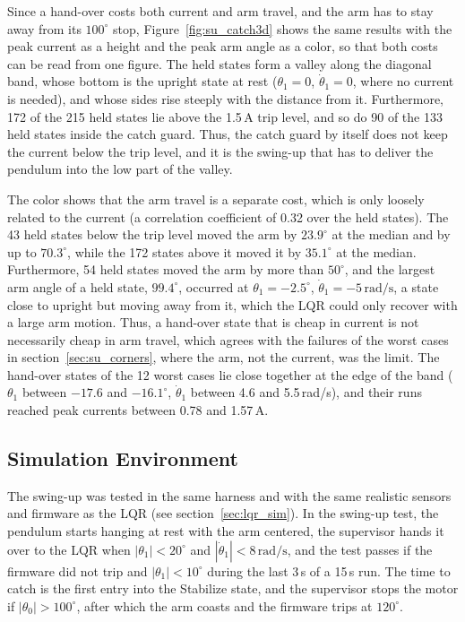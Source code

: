 \documentclass[a4paper,11pt]{article}
\begin{document}
Since a hand-over costs both current and arm travel, and the arm has to stay away from its $100^\circ$ stop, Figure~\ref{fig:su_catch3d} shows the same results with the peak current as a height and the peak arm angle as a color, so that both costs can be read from one figure. The held states form a valley along the diagonal band, whose bottom is the upright state at rest ($\theta_1 = 0$, $\dot\theta_1 = 0$, where no current is needed), and whose sides rise steeply with the distance from it. Furthermore, 172 of the 215 held states lie above the 1.5\,A trip level, and so do 90 of the 133 held states inside the catch guard. Thus, the catch guard by itself does not keep the current below the trip level, and it is the swing-up that has to deliver the pendulum into the low part of the valley.

The color shows that the arm travel is a separate cost, which is only loosely related to the current (a correlation coefficient of 0.32 over the held states). The 43 held states below the trip level moved the arm by $23.9^\circ$ at the median and by up to $70.3^\circ$, while the 172 states above it moved it by $35.1^\circ$ at the median. Furthermore, 54 held states moved the arm by more than $50^\circ$, and the largest arm angle of a held state, $99.4^\circ$, occurred at $\theta_1 = -2.5^\circ$, $\dot\theta_1 = -5\,\mathrm{rad/s}$, a state close to upright but moving away from it, which the LQR could only recover with a large arm motion. Thus, a hand-over state that is cheap in current is not necessarily cheap in arm travel, which agrees with the failures of the worst cases in section~\ref{sec:su_corners}, where the arm, not the current, was the limit. The hand-over states of the 12 worst cases lie close together at the edge of the band ($\theta_1$ between $-17.6$ and $-16.1^\circ$, $\dot\theta_1$ between 4.6 and 5.5\,rad/s), and their runs reached peak currents between 0.78 and 1.57\,A.

\subsection{Simulation Environment}
The swing-up was tested in the same harness and with the same realistic sensors and firmware as the LQR (see section~\ref{sec:lqr_sim}). In the swing-up test, the pendulum starts hanging at rest with the arm centered, the supervisor hands it over to the LQR when $|\theta_1| < 20^\circ$ and $|\dot\theta_1| < 8\,\mathrm{rad/s}$, and the test passes if the firmware did not trip and $|\theta_1| < 10^\circ$ during the last 3\,s of a 15\,s run. The time to catch is the first entry into the Stabilize state, and the supervisor stops the motor if $|\theta_0| > 100^\circ$, after which the arm coasts and the firmware trips at $120^\circ$.
\end{document}
